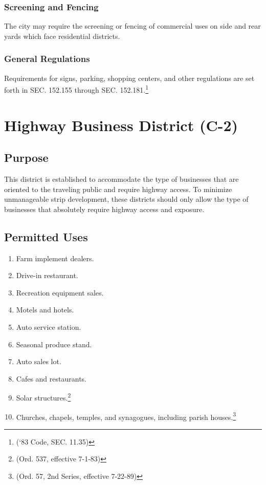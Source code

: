 \subsubsection{Screening and Fencing}
The city may require the screening or fencing of commercial uses on side and rear yards which face residential districts.
\subsubsection{General Regulations}
Requirements for signs, parking, shopping centers, and other regulations are set forth in SEC. 152.155 through SEC. 152.181.\footnote{(‘83 Code, SEC. 11.35)}

\section{Highway Business District (C-2)}
\subsection{Purpose}
This district is established to accommodate the type of businesses that are oriented to the traveling public and require highway access. To minimize unmanageable strip development, these districts should only allow the type of businesses that absolutely require highway access and exposure.
\subsection{Permitted Uses}
\begin{enumerate}[{\indent}1)]
    \item Farm implement dealers.
    \item Drive-in restaurant.
    \item Recreation equipment sales.
    \item Motels and hotels.
    \item Auto service station.
    \item Seasonal produce stand.
    \item Auto sales lot.
    \item Cafes and restaurants.
    \item Solar structures.\footnote{(Ord. 537, effective 7-1-83)}
    \item Churches, chapels, temples, and synagogues, including parish houses.\footnote{(Ord. 57, 2nd Series, effective 7-22-89)}
\end{enumerate}
